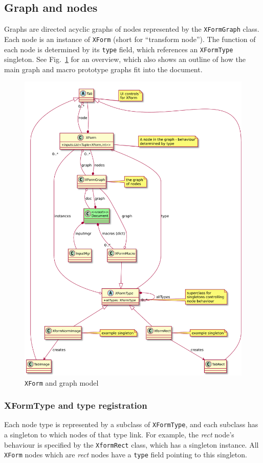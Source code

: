 \subsection{Graph and nodes}
Graphs are directed acyclic graphs of nodes represented by the 
\texttt{XFormGraph} class. Each node is an instance of \texttt{XForm}
(short for ``transform node''). The function of each node is
determined by its \texttt{type} field, which references an
\texttt{XFormType} singleton. See Fig.~\ref{xform.pdf} for an overview,
which also shows an outline of how the main graph and macro prototype
graphs fit into the document.

\begin{figure}[ht]
\center
\includegraphics[width=6in]{xform.pdf}
\caption{\texttt{XForm} and graph model}
\label{xform.pdf}
\end{figure}

\subsubsection{XFormType and type registration}
\label{xformtype}
Each node type is represented by a subclass of \texttt{XFormType},
and each subclass has a singleton to which nodes of that type link.
For example, the \emph{rect} node's behaviour is specified by
the \texttt{XformRect} class, which has a singleton instance. All
\texttt{XForm} nodes which are \emph{rect} nodes have a \texttt{type} field
pointing to this singleton.

